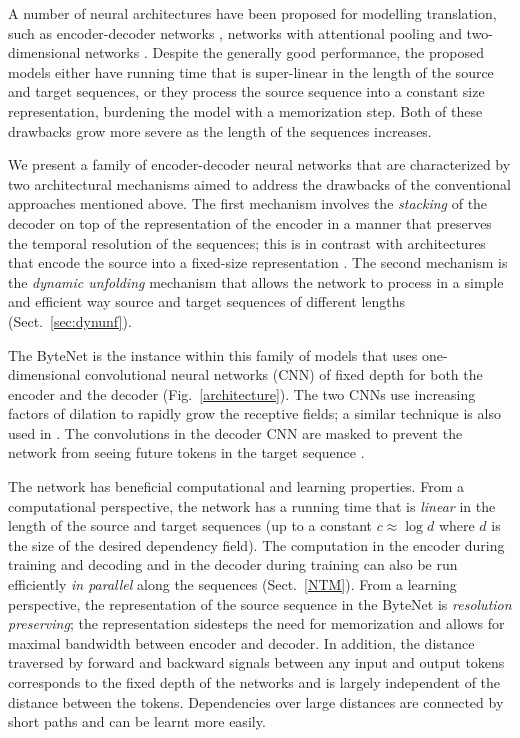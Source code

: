 A number of neural architectures have been proposed for modelling translation, such as encoder-decoder networks \citep{kalchbrenner13emnlp, DBLP:conf/nips/SutskeverVL14, DBLP:journals/corr/ChoMGBSB14,kaiser2016active}, networks with attentional pooling \citep{DBLP:journals/corr/BahdanauCB14} and two-dimensional networks \citep{DBLP:journals/corr/KalchbrennerDG15}. Despite the generally good performance, the proposed models either have running time that is super-linear in the length of the source and target sequences, or they process the source sequence into a constant size representation, burdening the model with a memorization step. Both of these drawbacks grow more severe as the length of the sequences increases.

We present a family of encoder-decoder neural networks that are characterized by two architectural mechanisms aimed to address the drawbacks of the conventional approaches mentioned above. The first mechanism involves the \emph{stacking} of the decoder on top of the representation of the encoder in a manner that preserves the temporal resolution of the sequences; this is in contrast with architectures that encode the source into a fixed-size representation \citep{kalchbrenner13emnlp, DBLP:conf/nips/SutskeverVL14}.  The second mechanism is the \emph{dynamic unfolding} mechanism that allows the network to process in a simple and efficient way source and target sequences of different lengths (Sect.~\ref{sec:dynunf}).

The ByteNet is the instance within this family of models that uses one-dimensional convolutional neural networks (CNN) of fixed depth for both the encoder and the decoder (Fig.~\ref{architecture}). The two CNNs use increasing factors of dilation to rapidly grow the receptive fields; a similar technique is also used in \citep{wavenet}. The convolutions in the decoder CNN are masked to prevent the network from seeing future tokens in the target sequence \citep{van2016pixel}.

The network has  beneficial computational and learning properties. From a computational perspective, the network has a running time that is \emph{linear} in the length of the source and target sequences (up to a constant $c \approx \log d$ where $d$ is the size of the desired dependency field). The computation in the encoder during training and decoding and in the decoder during training can also be run efficiently \emph{in parallel} along the sequences (Sect.~\ref{NTM}).
From a learning perspective, the representation of the source sequence in the ByteNet is \emph{resolution preserving}; the representation sidesteps the need for memorization and allows for maximal bandwidth between encoder and decoder. In addition, the distance traversed by forward and backward signals between any input and output tokens corresponds to the fixed depth of the networks and is largely independent of the distance between the tokens. Dependencies over large distances are connected by short paths and can be learnt more easily. 

